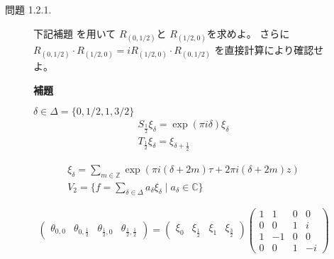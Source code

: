 \documentclass[12pt,b5paper]{ltjsarticle}
\begin{document}
\begin{description}
\begin{description}
\hrulefill

  \item[問題 1.2.1.]
             下記補題
             を用いて
             $R_{(0,1/2)}$と
             $R_{(1/2,0)}$を求めよ。
             さらに
             $R_{(0,1/2)}\cdot R_{(1/2,0)}=iR_{(1/2,0)}\cdot R_{(0,1/2)}$
             を直接計算により確認せよ。

             \textbf{補題}

             $\delta \in \Delta = \{0,1/2,1,3/2\}$
             \begin{gather}
              S_{\frac{1}{2}} \xi_{\delta} = \exp{(\pi i \delta)} \xi_{\delta}\\
              T_{\frac{1}{2}} \xi_{\delta} = \xi_{\delta + \frac{1}{2}}
             \end{gather}

\dotfill

\begin{gather}
 \xi_{\delta} = \sum_{m\in\mathbb{Z}} \exp{(\pi i(\delta+2m)\tau + 2\pi i(\delta+2m)z)}\\
 V_{2}=\{ f = \sum_{\delta\in\Delta} a_{\delta}\xi_{\delta} \mid a_{\delta}\in\mathbb{C}\}
\end{gather}

\begin{equation}
 \begin{pmatrix}
  \theta_{0,0} & \theta_{0,\frac{1}{2}} & \theta_{\frac{1}{2},0} & \theta_{\frac{1}{2},\frac{1}{2}}
 \end{pmatrix}
 =
 \begin{pmatrix}
  \xi_{0} & \xi_{\frac{1}{2}} & \xi_{1} & \xi_{\frac{3}{2}}
 \end{pmatrix}
 \begin{pmatrix}
  1 & 1 & 0 & 0 \\
  0 & 0 & 1 & i \\
  1 & -1 & 0 & 0 \\
  0 & 0 & 1 & -i
 \end{pmatrix}
\end{equation}


\end{description}
\end{description}
\end{document}
